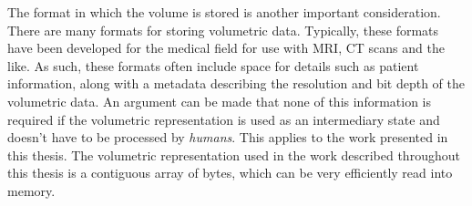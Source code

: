 The format in which the volume is stored is another important
consideration. There are many formats for storing volumetric
data. Typically, these formats have been developed for the medical
field for use with MRI, CT scans and the like. As such, these formats
often include space for details such as patient information, along
with a metadata describing the resolution and bit depth of the
volumetric data. An argument can be made that none of this information
is required if the volumetric representation is used as an
intermediary state and doesn't have to be processed by
\textit{humans}. This applies to the work presented in this
thesis. The volumetric representation used in the work described
throughout this thesis is a contiguous array of bytes, which can be
very efficiently read into memory.


